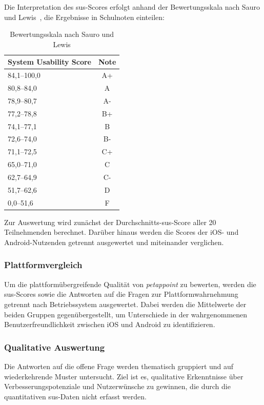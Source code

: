 Die Interpretation des \gls{sus}-Scores erfolgt anhand der Bewertungsskala nach Sauro und Lewis~\cite[S.~204]{susbenchmark2008}, die Ergebnisse in Schulnoten einteilen:

\begin{table}[H]
\centering
\begin{tabular}{|l|c|}
\hline
\textbf{System Usability Score} & \textbf{Note} \\
\hline
84{,}1--100{,}0 & A+ \\
80{,}8--84{,}0  & A  \\
78{,}9--80{,}7  & A- \\
77{,}2--78{,}8  & B+ \\
74{,}1--77{,}1  & B  \\
72{,}6--74{,}0  & B- \\
71{,}1--72{,}5  & C+ \\
65{,}0--71{,}0  & C  \\
62{,}7--64{,}9  & C- \\
51{,}7--62{,}6  & D  \\
0{,}0--51{,}6   & F  \\
\hline
\end{tabular}
\caption{Bewertungsskala nach Sauro und Lewis \cite[S.~204]{susbenchmark2008}}
\label{tab:sus-skala}
\end{table}

Zur Auswertung wird zunächst der Durchschnitts-\gls{sus}-Score aller 20 Teilnehmenden berechnet. Darüber hinaus werden die Scores der iOS- und Android-Nutzenden getrennt ausgewertet und miteinander verglichen. 

\subsubsection{Plattformvergleich}

Um die plattformübergreifende Qualität von \textit{petappoint} zu bewerten, werden die \gls{sus}-Scores sowie die Antworten auf die Fragen zur Plattformwahrnehmung getrennt nach Betriebssystem ausgewertet. Dabei werden die Mittelwerte der beiden Gruppen gegenübergestellt, um Unterschiede in der wahrgenommenen Benutzerfreundlichkeit zwischen iOS und Android zu identifizieren.

\subsubsection{Qualitative Auswertung}

Die Antworten auf die offene Frage werden thematisch gruppiert und auf wiederkehrende Muster untersucht. Ziel ist es, qualitative Erkenntnisse über Verbesserungspotenziale und Nutzerwünsche zu gewinnen, die durch die quantitativen \gls{sus}-Daten nicht erfasst werden.

